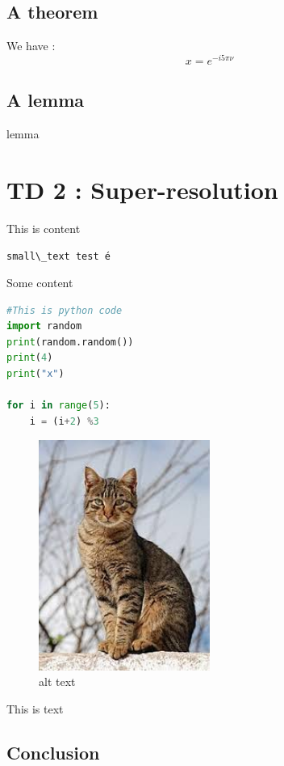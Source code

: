 \documentclass[a4paper, left=1cm, right=1cm, top=1cm, bottom=1cm,french]{article}
\let\oldincludegraphics\includegraphics
\renewcommand{\includegraphics}[2][]{\oldincludegraphics[width=0.5\textwidth,#1]{#2}}
\newcommand{\passthrough}[1]{#1}
\begin{document}
\hypertarget{a-theorem}{%
\subsection{A theorem}\label{a-theorem}}

We have : \[x = e^{- i 5\pi \nu}\]

\hypertarget{a-lemma}{%
\subsection{A lemma}\label{a-lemma}}

lemma

\hypertarget{td-2-super-resolution}{%
\section{TD 2 : Super-resolution}\label{td-2-super-resolution}}

This is content

\passthrough{\lstinline!small\_text test é!}

Some content

\begin{lstlisting}[language=Python]
#This is python code
import random
print(random.random())
print(4)
print("x")

for i in range(5):
    i = (i+2) %3
\end{lstlisting}

\begin{figure}
\centering
\includegraphics{image.png}
\caption{alt text}
\end{figure}

This is text

\hypertarget{conclusion}{%
\subsection{Conclusion}\label{conclusion}}
\end{document}
